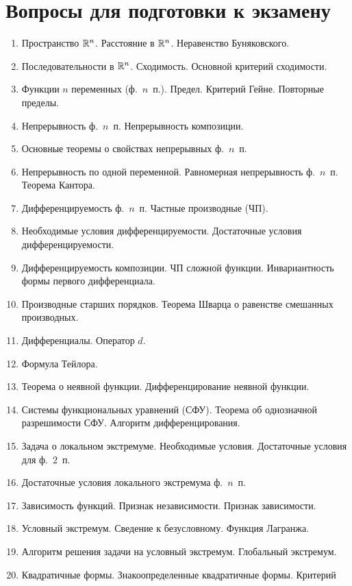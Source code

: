 \documentclass[../main.tex]{subfiles}
\begin{document}
 \chapter*{Вопросы для подготовки к экзамену}
 
 \begin{enumerate}
  \item Пространство $\mathbb{R}^n$. Расстояние в $\mathbb{R}^n$. Неравенство Буняковского.
  \item Последовательности в $\mathbb{R}^n$. Сходимость. Основной критерий сходимости. 
  \item Функции $n$ переменных (ф.~$n$~п.). Предел. Критерий Гейне. Повторные 
  пределы.
  \item Непрерывность ф.~$n$~п. Непрерывность композиции.
  \item Основные теоремы о свойствах непрерывных ф.~$n$~п.
  \item Непрерывность по одной переменной. Равномерная непрерывность ф.~$n$~п. 
  Теорема Кантора.
  \item Дифференцируемость ф.~$n$~п. Частные производные (ЧП).
  \item Необходимые условия дифференцируемости. Достаточные условия 
  дифференцируемости.
  \item Дифференцируемость композиции. ЧП сложной функции. Инвариантность 
  формы первого дифференциала.
  \item Производные старших порядков. Теорема Шварца о равенстве смешанных 
  производных.
  \item Дифференциалы. Оператор $d$.
  \item Формула Тейлора.
  \item Теорема о неявной функции. Дифференцирование неявной функции. 
  \item Системы функциональных уравнений (СФУ). Теорема об однозначной 
  разрешимости СФУ. Алгоритм дифференцирования.
  \item Задача о локальном экстремуме. Необходимые условия. Достаточные 
  условия для ф.~$2$~п.
  \item Достаточные условия локального экстремума ф.~$n$~п.
  \item Зависимость функций. Признак независимости. Признак зависимости.
  \item Условный экстремум. Сведение к безусловному. Функция Лагранжа.
  \item Алгоритм решения задачи на условный экстремум. Глобальный экстремум.
  \item Квадратичные формы. Знакоопределенные квадратичные формы. Критерий 

\end{enumerate}
\end{document}
